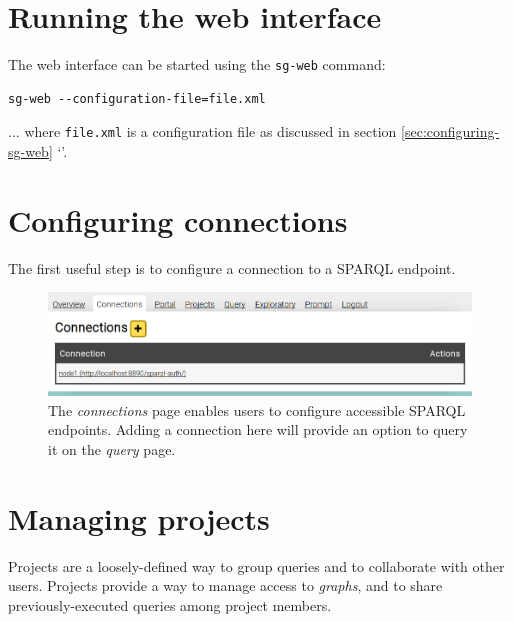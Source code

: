 \section{Running the web interface}

  The web interface can be started using the \texttt{sg-web} command:

\begin{siderules}
\begin{verbatim}
sg-web --configuration-file=file.xml
\end{verbatim}
\end{siderules}

  $\ldots{}$ where \texttt{file.xml} is a configuration file as
  discussed in section \ref{sec:configuring-sg-web}
  {\color{LinkGray}`'}.

\section{Configuring connections}
\label{sec:configure-connections}

  The first useful step is to configure a connection to a SPARQL endpoint.

  \begin{figure}[h]
    \begin{center}
      \includegraphics[width=1.0\textwidth]{figures/web-connections.png}
    \end{center}
    \caption{The \emph{connections} page enables users to configure accessible
      SPARQL endpoints.  Adding a connection here will provide an option to
      query it on the \emph{query} page.}
    \label{fig:web-connections}
  \end{figure}

\section{Managing projects}

  Projects are a loosely-defined way to group queries and to collaborate with
  other users.  Projects provide a way to manage access to \emph{graphs}, and
  to share previously-executed queries among project members.

